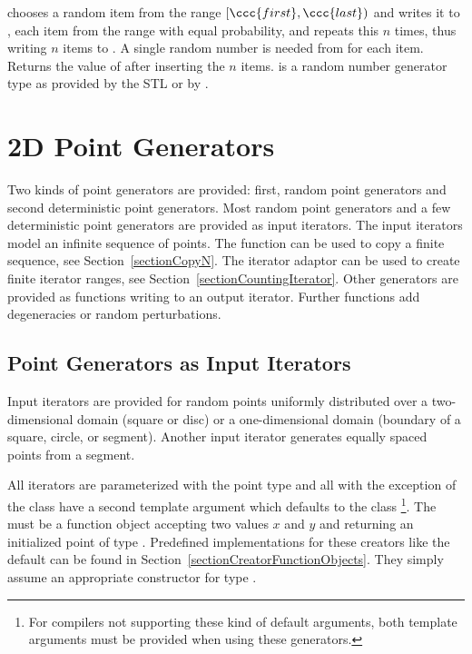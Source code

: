 
{ chooses a random item from the range $[\ccc{first},\ccc{last})$ and
    writes it to , each item from the range with equal
    probability, and repeats this $n$ times, thus writing $n$ items to
    .
    A single random number is needed from  for each item.
    Returns the value of  after inserting the $n$ items.
    \ccPrecond {} is a random number generator type as provided 
    by the STL or by .
}


\section{2D Point Generators}
\label{sectionPointGenerators}

Two kinds of point generators are provided: first, random point
generators and second deterministic point generators. Most random
point generators and a few deterministic point generators are provided
as input iterators.  The input iterators model an infinite sequence of
points. The function  can be used to copy a
finite sequence, see Section~\ref{sectionCopyN}. The iterator adaptor
 can be used to create finite iterator
ranges, see Section~\ref{sectionCountingIterator}.
Other generators are provided as functions writing to an output
iterator. Further functions add degeneracies or random perturbations.


\subsection{Point Generators as Input Iterators}

\ccDefinition

Input iterators are provided for random points uniformly distributed
over a two-dimensional domain (square or disc) or a one-dimensional
domain (boundary of a square, circle, or segment). Another input
iterator generates equally spaced points from a segment.

All iterators are parameterized with the point type  and all
with the exception of the class  have a second
template argument  which defaults to the class
\footnote{%
  For compilers not supporting these kind of default arguments, both
  template arguments must be provided when using these generators.}.
The  must be a function object accepting two 
values $x$ and $y$ and returning an initialized point  of type
. Predefined implementations for these creators like the
default can be found in Section~\ref{sectionCreatorFunctionObjects}.
They simply assume an appropriate constructor for type .

